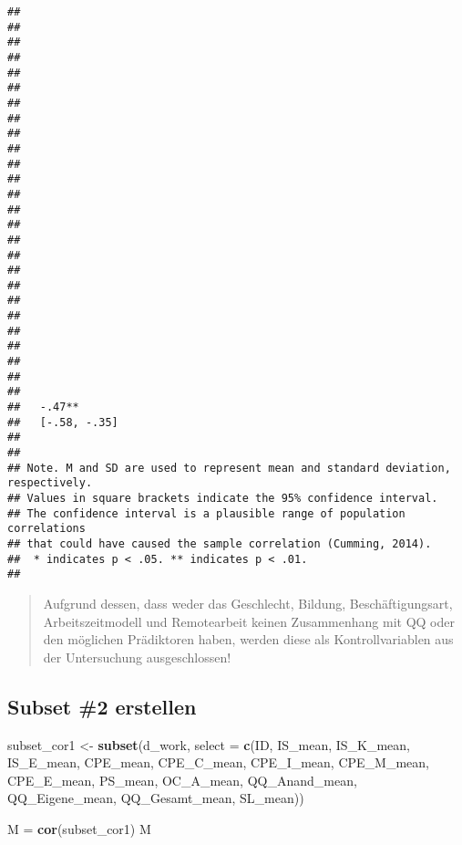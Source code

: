 \documentclass[
]{article}
\newenvironment{Shaded}{\begin{snugshade}}{\end{snugshade}}
\newcommand{\AttributeTok}[1]{\textcolor[rgb]{0.13,0.29,0.53}{#1}}
\newcommand{\FunctionTok}[1]{\textcolor[rgb]{0.13,0.29,0.53}{\textbf{#1}}}
\newcommand{\NormalTok}[1]{#1}
\newcommand{\OtherTok}[1]{\textcolor[rgb]{0.56,0.35,0.01}{#1}}
\begin{document}
\begin{verbatim}
##               
##               
##               
##               
##               
##               
##               
##               
##               
##               
##               
##               
##               
##               
##               
##               
##               
##               
##               
##               
##               
##               
##               
##               
##               
##               
##   -.47**      
##   [-.58, -.35]
##               
## 
## Note. M and SD are used to represent mean and standard deviation, respectively.
## Values in square brackets indicate the 95% confidence interval.
## The confidence interval is a plausible range of population correlations 
## that could have caused the sample correlation (Cumming, 2014).
##  * indicates p < .05. ** indicates p < .01.
## 
\end{verbatim}

\begin{quote}
Aufgrund dessen, dass weder das Geschlecht, Bildung, Beschäftigungsart,
Arbeitszeitmodell und Remotearbeit keinen Zusammenhang mit QQ oder den
möglichen Prädiktoren haben, werden diese als Kontrollvariablen aus der
Untersuchung ausgeschlossen!
\end{quote}

\subsection{Subset \#2 erstellen}\label{subset-2-erstellen}

\begin{Shaded}
\begin{Highlighting}[]
\NormalTok{subset\_cor1 }\OtherTok{\textless{}{-}} \FunctionTok{subset}\NormalTok{(d\_work,}
                     \AttributeTok{select =} \FunctionTok{c}\NormalTok{(ID, IS\_mean, IS\_K\_mean, IS\_E\_mean, CPE\_mean, CPE\_C\_mean, CPE\_I\_mean, CPE\_M\_mean, CPE\_E\_mean, PS\_mean, OC\_A\_mean, QQ\_Anand\_mean, QQ\_Eigene\_mean, QQ\_Gesamt\_mean, SL\_mean))}
\end{Highlighting}
\end{Shaded}

\begin{Shaded}
\begin{Highlighting}[]
\NormalTok{M }\OtherTok{=} \FunctionTok{cor}\NormalTok{(subset\_cor1)}
\NormalTok{M}
\end{Highlighting}
\end{Shaded}
\end{document}
